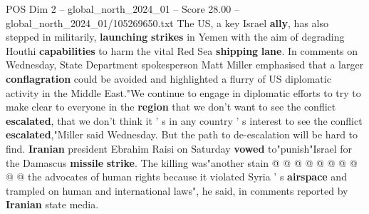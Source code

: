 \begin{textsample}{POS Dim 2 – global\_north\_2024\_01 – Score 28.00 – global\_north\_2024\_01/105269650.txt}
The US, a key Israel \textbf{ally}, has also stepped in militarily, \textbf{launching} \textbf{strikes} in Yemen with the aim of degrading Houthi \textbf{capabilities} to harm the vital Red Sea \textbf{shipping} \textbf{lane}.
In comments on Wednesday, State Department spokesperson Matt Miller emphasised that a larger \textbf{conflagration} could be avoided and highlighted a flurry of US diplomatic activity in the Middle East."We continue to engage in diplomatic efforts to try to make clear to everyone in the \textbf{region} that we don't want to see the conflict \textbf{escalated}, that we don't think it ' s in any country ' s interest to see the conflict \textbf{escalated},"Miller said Wednesday.
But the path to de-escalation will be hard to find. \textbf{Iranian} president Ebrahim Raisi on Saturday \textbf{vowed} to"punish"Israel for the Damascus \textbf{missile} \textbf{strike}.
The killing was"another stain @ @ @ @ @ @ @ @ @ @ the advocates of human rights because it violated Syria ' s \textbf{airspace} and trampled on human and international laws", he said, in comments reported by \textbf{Iranian} state media.

\end{textsample}
